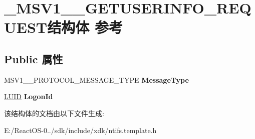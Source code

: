 \hypertarget{struct___m_s_v1__0___g_e_t_u_s_e_r_i_n_f_o___r_e_q_u_e_s_t}{}\section{\+\_\+\+M\+S\+V1\+\_\+\_\+\+G\+E\+T\+U\+S\+E\+R\+I\+N\+F\+O\+\_\+\+R\+E\+Q\+U\+E\+S\+T结构体 参考}
\label{struct___m_s_v1__0___g_e_t_u_s_e_r_i_n_f_o___r_e_q_u_e_s_t}
\subsection*{Public 属性}
\begin{DoxyCompactItemize}
\item 
\mbox{\label{struct___m_s_v1__0___g_e_t_u_s_e_r_i_n_f_o___r_e_q_u_e_s_t_ae105aa9054d6fc9749c04f6d8d7b0881}} 
M\+S\+V1\+\_\+\_\+\+P\+R\+O\+T\+O\+C\+O\+L\+\_\+\+M\+E\+S\+S\+A\+G\+E\+\_\+\+T\+Y\+PE {\bfseries Message\+Type}
\item 
\mbox{\label{struct___m_s_v1__0___g_e_t_u_s_e_r_i_n_f_o___r_e_q_u_e_s_t_ae9b2000fa6625106a8a4c80e74411e68}} 
\hyperlink{struct___l_u_i_d}{L\+U\+ID} {\bfseries Logon\+Id}
\end{DoxyCompactItemize}


该结构体的文档由以下文件生成\+:\begin{DoxyCompactItemize}
\item 
E\+:/\+React\+O\+S-\/0../sdk/include/xdk/ntifs.\+template.\+h\end{DoxyCompactItemize}
